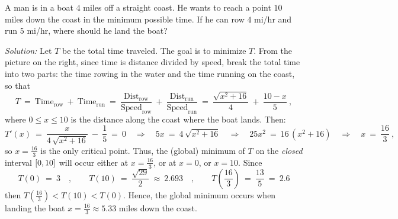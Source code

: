 \divider
\newpage
\begin{exmp}\label{exmp:minmax5}
\noindent A man is in a boat $4$ miles off a straight coast. He wants to reach a
  point $10$ miles down the coast in the minimum possible time. If he can row
  $4$ mi/hr and run $5$ mi/hr, where should he land the boat?
 \par\noindent\emph{Solution:} Let $T$ be the total time traveled. The goal is
 to minimize $T$. From the picture on the right, since time is distance divided
 by speed, break the total time into two parts: the time rowing in the water and
 the time running on the coast, so that
 \begin{displaymath}
  T ~=~ \text{Time}_{\text{row}} ~+~ \text{Time}_{\text{run}} ~=~
   \dfrac{\text{Dist}_{\text{row}}}{\text{Speed}_{\text{row}}} ~+~
   \dfrac{\text{Dist}_{\text{run}}}{\text{Speed}_{\text{run}}} ~=~
   \dfrac{\sqrt{x^2 + 16}}{4} ~+~ \dfrac{10-x}{5} ~,
 \end{displaymath}
 where $0 \le x \le 10$ is the distance along the coast where the boat lands.
 Then:
 \begin{displaymath}
  T'(x) ~=~ \dfrac{x}{4\,\sqrt{x^2 + 16}} ~-~ \dfrac{1}{5} ~=~ 0
   \quad\Rightarrow\quad 5x ~=~ 4\,\sqrt{x^2 + 16} \quad\Rightarrow\quad
   25x^2 ~=~ 16\,(x^2 + 16) \quad\Rightarrow\quad x ~=~ \dfrac{16}{3} ~,
 \end{displaymath}
 so $x=\frac{16}{3}$ is the only critical point. Thus, the (global) minimum of
 $T$ on the \emph{closed} interval $\lbrack 0,10 \rbrack$ will occur either at $x=\frac{16}{3}$, or at $x=0$, or $x=10$. Since
\[
T(0) ~=~ 3 \quad,\qquad T(10) ~=~ \frac{\sqrt{29}}{2} ~\approx~ 2.693
\quad,\qquad T\left(\frac{16}{3}\right) ~=~ \frac{13}{5} ~=~ 2.6
\]
then $T(\frac{16}{3}) < T(10) < T(0)$. Hence, the global minimum occurs when
landing the boat $x= \frac{16}{3} \approx 5.33$ miles down the coast.\vspace{2mm}


\end{exmp}
